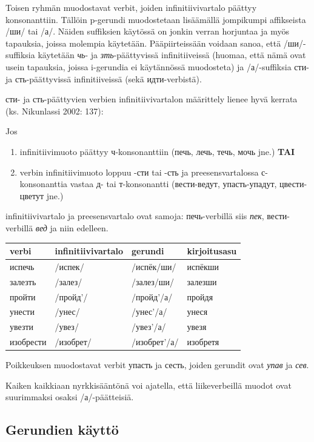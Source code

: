 \documentclass[]{scrartcl}
\providecommand{\tightlist}{%
  \setlength{\itemsep}{0pt}\setlength{\parskip}{0pt}}
\begin{document}
Toisen ryhmän muodostavat verbit, joiden infinitiivivartalo päättyy
konsonanttiin. Tällöin p-gerundi muodostetaan lisäämällä jompikumpi
affikseista /ши/ tai /а/. Näiden suffiksien käytössä on jonkin verran
horjuntaa ja myös tapauksia, joissa molempia käytetään. Pääpiirteissään
voidaan sanoa, että /ши/-suffiksia käytetään \emph{чь}- ja
\emph{зть}-päättyvissä infinitiiveissä (huomaa, että nämä ovat usein
tapauksia, joissa i-gerundia ei käytännössä muodosteta) ja /а/-suffiksia
сти- ja сть-päättyvissä infinitiiveissä (sekä идти-verbistä).

сти- ja сть-päättyvien verbien infinitiivivartalon määrittely lienee
hyvä kerrata (ks. Nikunlassi 2002: 137):

Jos

\begin{enumerate}
\def\labelenumi{\alph{enumi}.}
\tightlist
\item
  infinitiivimuoto päättyy ч-konsonanttiin (печь, лечь, течь, мочь jne.)
  \textbf{TAI}
\item
  verbin infinitiivimuoto loppuu -сти tai -сть ja preesensvartalossa
  с-konsonanttia vastaa д- tai т-konsonantti (вести-ведут,
  упасть-упадут, цвести-цветут jne.)
\end{enumerate}

infinitiivivartalo ja preesensvartalo ovat samoja: печь-verbillä siis
\emph{пек}, вести-verbillä \emph{вед} ja niin edelleen.

\begin{longtable}[c]{@{}llll@{}}
\toprule
verbi & infinitiivivartalo & gerundi & kirjoitusasu\tabularnewline
\midrule
\endhead
испечь & /испек/ & /испёк/ши/ & испёкши\tabularnewline
залезть & /залез/ & /залез/ши/ & залезши\tabularnewline
пройти & /пройд'/ & /пройд'/а/ & пройдя\tabularnewline
унести & /унес/ & /унес'/а/ & унеся\tabularnewline
увезти & /увез/ & /увез'/а/ & увезя\tabularnewline
изобрести & /изобрет/ & /изобрет'/а/ & изобретя\tabularnewline
\bottomrule
\end{longtable}

Poikkeuksen muodostavat verbit упасть ja сесть, joiden gerundit ovat
\emph{упав} ja \emph{сев}.

Kaiken kaikkiaan nyrkkisääntönä voi ajatella, että liikeverbeillä muodot
ovat suurimmaksi osaksi /а/-päätteisiä.

\subsection{Gerundien käyttö}\label{gerundien-kuxe4yttuxf6}
\end{document}
